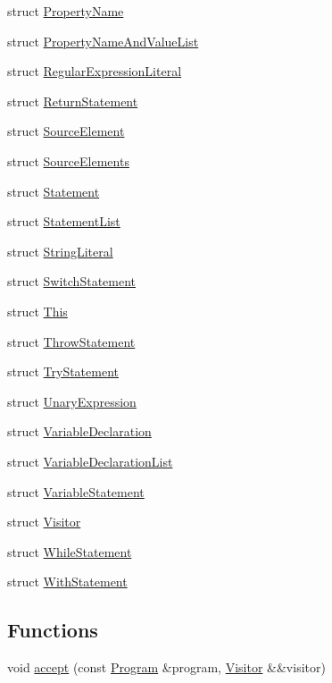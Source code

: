 \begin{DoxyCompactItemize}
struct \hyperlink{structast_1_1_property_name}{Property\+Name}
\item 
struct \hyperlink{structast_1_1_property_name_and_value_list}{Property\+Name\+And\+Value\+List}
\item 
struct \hyperlink{structast_1_1_regular_expression_literal}{Regular\+Expression\+Literal}
\item 
struct \hyperlink{structast_1_1_return_statement}{Return\+Statement}
\item 
struct \hyperlink{structast_1_1_source_element}{Source\+Element}
\item 
struct \hyperlink{structast_1_1_source_elements}{Source\+Elements}
\item 
struct \hyperlink{structast_1_1_statement}{Statement}
\item 
struct \hyperlink{structast_1_1_statement_list}{Statement\+List}
\item 
struct \hyperlink{structast_1_1_string_literal}{String\+Literal}
\item 
struct \hyperlink{structast_1_1_switch_statement}{Switch\+Statement}
\item 
struct \hyperlink{structast_1_1_this}{This}
\item 
struct \hyperlink{structast_1_1_throw_statement}{Throw\+Statement}
\item 
struct \hyperlink{structast_1_1_try_statement}{Try\+Statement}
\item 
struct \hyperlink{structast_1_1_unary_expression}{Unary\+Expression}
\item 
struct \hyperlink{structast_1_1_variable_declaration}{Variable\+Declaration}
\item 
struct \hyperlink{structast_1_1_variable_declaration_list}{Variable\+Declaration\+List}
\item 
struct \hyperlink{structast_1_1_variable_statement}{Variable\+Statement}
\item 
struct \hyperlink{structast_1_1_visitor}{Visitor}
\item 
struct \hyperlink{structast_1_1_while_statement}{While\+Statement}
\item 
struct \hyperlink{structast_1_1_with_statement}{With\+Statement}
\end{DoxyCompactItemize}
\subsection*{Functions}
\begin{DoxyCompactItemize}
\item 
void \hyperlink{namespaceast_ae8ec562ad69aa05004765217ff90879b}{accept} (const \hyperlink{structast_1_1_program}{Program} \&program, \hyperlink{structast_1_1_visitor}{Visitor} \&\&visitor)
\end{DoxyCompactItemize}


